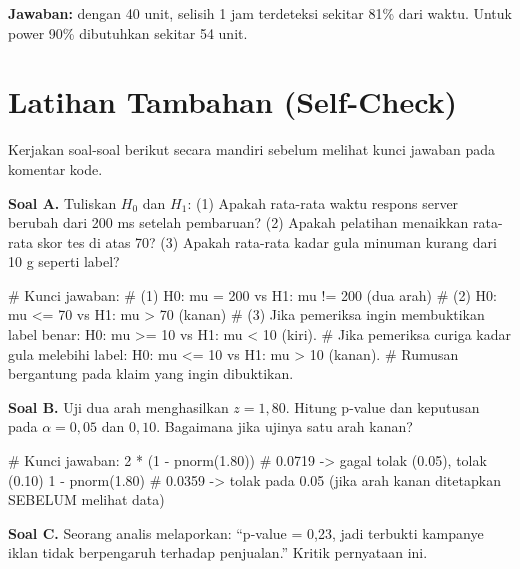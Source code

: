 \documentclass[
  indonesian,
  letterpaper,
]{book}
\newenvironment{Shaded}{\begin{snugshade}}{\end{snugshade}}
\newcommand{\CommentTok}[1]{\textcolor[rgb]{0.37,0.37,0.37}{#1}}
\newcommand{\DecValTok}[1]{\textcolor[rgb]{0.68,0.00,0.00}{#1}}
\newcommand{\FloatTok}[1]{\textcolor[rgb]{0.68,0.00,0.00}{#1}}
\newcommand{\FunctionTok}[1]{\textcolor[rgb]{0.28,0.35,0.67}{#1}}
\newcommand{\NormalTok}[1]{\textcolor[rgb]{0.00,0.23,0.31}{#1}}
\newcommand{\SpecialCharTok}[1]{\textcolor[rgb]{0.37,0.37,0.37}{#1}}
\begin{document}
\textbf{Jawaban:} dengan 40 unit, selisih 1 jam terdeteksi sekitar 81\%
dari waktu. Untuk power 90\% dibutuhkan sekitar 54 unit.

\section{Latihan Tambahan
(Self-Check)}\label{latihan-tambahan-self-check-1}

Kerjakan soal-soal berikut secara mandiri sebelum melihat kunci jawaban
pada komentar kode.

\textbf{Soal A.} Tuliskan \(H_0\) dan \(H_1\): (1) Apakah rata-rata
waktu respons server berubah dari 200 ms setelah pembaruan? (2) Apakah
pelatihan menaikkan rata-rata skor tes di atas 70? (3) Apakah rata-rata
kadar gula minuman kurang dari 10 g seperti label?

\begin{Shaded}
\begin{Highlighting}[]
\CommentTok{\# Kunci jawaban:}
\CommentTok{\# (1) H0: mu = 200 vs H1: mu != 200 (dua arah)}
\CommentTok{\# (2) H0: mu \textless{}= 70 vs H1: mu \textgreater{} 70 (kanan)}
\CommentTok{\# (3) Jika pemeriksa ingin membuktikan label benar: H0: mu \textgreater{}= 10 vs H1: mu \textless{} 10 (kiri).}
\CommentTok{\#     Jika pemeriksa curiga kadar gula melebihi label: H0: mu \textless{}= 10 vs H1: mu \textgreater{} 10 (kanan).}
\CommentTok{\#     Rumusan bergantung pada klaim yang ingin dibuktikan.}
\end{Highlighting}
\end{Shaded}

\textbf{Soal B.} Uji dua arah menghasilkan \(z = 1{,}80\). Hitung
p-value dan keputusan pada \(\alpha = 0{,}05\) dan \(0{,}10\). Bagaimana
jika ujinya satu arah kanan?

\begin{Shaded}
\begin{Highlighting}[]
\CommentTok{\# Kunci jawaban:}
\DecValTok{2} \SpecialCharTok{*}\NormalTok{ (}\DecValTok{1} \SpecialCharTok{{-}} \FunctionTok{pnorm}\NormalTok{(}\FloatTok{1.80}\NormalTok{))   }\CommentTok{\# 0.0719 {-}\textgreater{} gagal tolak (0.05), tolak (0.10)}
\DecValTok{1} \SpecialCharTok{{-}} \FunctionTok{pnorm}\NormalTok{(}\FloatTok{1.80}\NormalTok{)         }\CommentTok{\# 0.0359 {-}\textgreater{} tolak pada 0.05 (jika arah kanan ditetapkan SEBELUM melihat data)}
\end{Highlighting}
\end{Shaded}

\textbf{Soal C.} Seorang analis melaporkan: ``p-value = 0,23, jadi
terbukti kampanye iklan tidak berpengaruh terhadap penjualan.'' Kritik
pernyataan ini.
\end{document}
